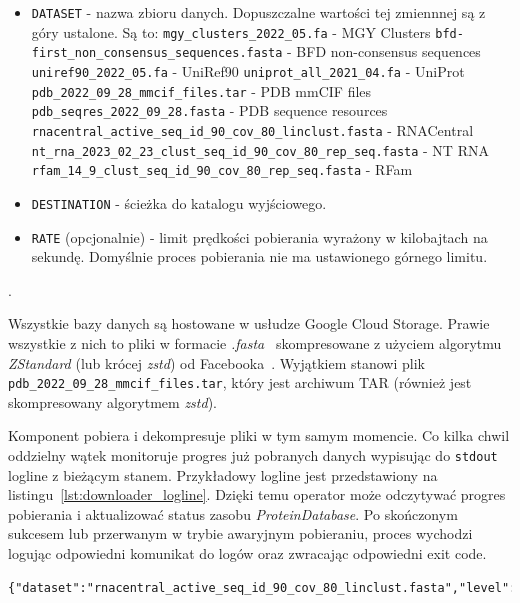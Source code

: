 \begin{itemize}
    \item \texttt{DATASET} - nazwa zbioru danych.
    Dopuszczalne wartości tej zmiennnej są z góry ustalone.
    Są to:
    \subitem \texttt{mgy\_clusters\_2022\_05.fa} - MGY Clusters
    \subitem \texttt{bfd-first\_non\_consensus\_sequences.fasta} - BFD non-consensus sequences
    \subitem \texttt{uniref90\_2022\_05.fa} - UniRef90
    \subitem \texttt{uniprot\_all\_2021\_04.fa} - UniProt
    \subitem \texttt{pdb\_2022\_09\_28\_mmcif\_files.tar} - PDB mmCIF files
    \subitem \texttt{pdb\_seqres\_2022\_09\_28.fasta} - PDB sequence resources
    \subitem \texttt{rnacentral\_active\_seq\_id\_90\_cov\_80\_linclust.fasta} - RNACentral
    \subitem \texttt{nt\_rna\_2023\_02\_23\_clust\_seq\_id\_90\_cov\_80\_rep\_seq.fasta} - NT RNA
    \subitem \texttt{rfam\_14\_9\_clust\_seq\_id\_90\_cov\_80\_rep\_seq.fasta} - RFam
    \item \texttt{DESTINATION} - ścieżka do katalogu wyjściowego.
    \item \texttt{RATE} (opcjonalnie) - limit prędkości pobierania wyrażony w kilobajtach na sekundę.
    Domyślnie proces pobierania nie ma ustawionego górnego limitu.
\end{itemize}.

Wszystkie bazy danych są hostowane w usłudze Google Cloud Storage.
Prawie wszystkie z nich to pliki w formacie \textit{.fasta}~\cite{pearson1988fasta} skompresowane z użyciem algorytmu \textit{ZStandard} (lub krócej \textit{zstd}) od Facebooka~\cite{zstandard}.
Wyjątkiem stanowi plik \texttt{pdb\_2022\_09\_28\_mmcif\_files.tar}, który jest archiwum TAR (również jest skompresowany algorytmem \textit{zstd}).

Komponent pobiera i dekompresuje pliki w tym samym momencie.
Co kilka chwil oddzielny wątek monitoruje progres już pobranych danych wypisując do \texttt{stdout} logline z bieżącym stanem.
Przykładowy logline jest przedstawiony na listingu~\ref{lst:downloader_logline}.
Dzięki temu operator może odczytywać progres pobierania i aktualizować status zasobu \textit{ProteinDatabase}.
Po skończonym sukcesem lub przerwanym w trybie awaryjnym pobieraniu, proces wychodzi logując odpowiedni komunikat do logów oraz zwracając odpowiedni exit code.

\begin{lstlisting}[language=txt,caption={Sample logline from downloader},label={lst:downloader_logline}]
{"dataset":"rnacentral_active_seq_id_90_cov_80_linclust.fasta","level":"info","msg":"Download progress","size":7700349721,"time":"2025-05-17T16:53:52+02:00","total":13860314914,"type":"download","unit":"bytes"}
\end{lstlisting}

